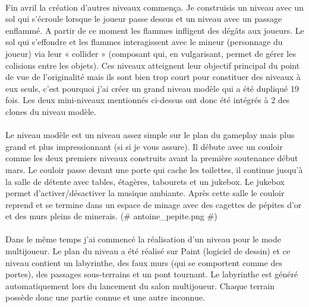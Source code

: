 \documentclass[titlepage, 13px, a4paper]{report}
\begin{document}
\paragraph{} \hspace{0pt} 
Fin avril la création d'autres niveaux commença. Je construisis un niveau avec un
sol qui s'écroule lorsque le joueur passe dessus et un niveau avec un passage
enflammé. A partir de ce moment les flammes infligent des dégâts aux joueurs. Le
sol qui s'effondre et les flammes interagissent avec le mineur (personnage du
joueur) via leur « collider » (composant qui, en vulgarisant, permet de gérer les
colisions entre les objets). Ces niveaux atteignent leur objectif principal du point de vue de
l'originalité mais ils sont bien trop court pour constituer des niveaux à eux seuls,
c'est pourquoi j'ai créer un grand niveau modèle qui a été dupliqué 19 fois. Les
deux mini-niveaux mentionnés ci-dessus ont donc été intégrés à 2 des clones du
niveau modèle. \\


\paragraph{} \hspace{0pt}
Le niveau modèle est un niveau assez simple sur le plan du gameplay mais plus
grand et plus impressionnant (si si je vous assure). Il débute avec un couloir
comme les deux premiers niveaux construits avant la première soutenance début
mars. Le couloir passe devant une porte qui cache les toilettes, il continue jusqu'à
la salle de détente avec tables, étagères, tabourets et un jukebox. Le jukebox
permet d'activer/désactiver la musique ambiante. Après cette salle le couloir
reprend et se termine dans un espace de minage avec des cagettes de pépites
d'or et des murs pleins de minerais. \@(\# antoine\_pepite.png \#)\@   \\


\paragraph{} \hspace{0pt} 
Dans le même temps j'ai commencé la réalisation d'un niveau pour le mode
multijoueur. Le plan du niveau a été réalisé sur Paint (logiciel de dessin) et ce
niveau contient un labyrinthe, des faux murs (qui se comportent comme des
portes), des passages sous-terrains et un pont tournant. Le labyrinthe est généré
automatiquement lors du lancement du salon multijoueur. Chaque terrain possède
donc une partie connue et une autre inconnue. \\
\end{document}

